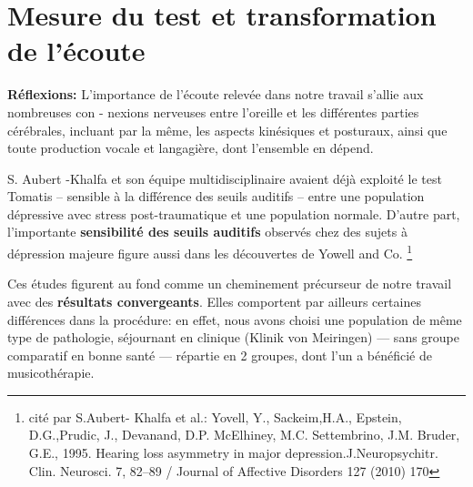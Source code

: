 \section{Mesure du test et trans\-for\-ma\-tion de l'écoute}
\textbf{Réflexions:}
L'importance de l'écoute relevée dans notre travail
s'allie aux nombreuses con - nexions nerveuses entre l'oreille et les
différentes parties cérébrales, incluant par la même, les aspects kinésiques
et posturaux, ainsi que toute production vocale et langagière,
dont l'ensemble en dépend.



S. Aubert -Khalfa et son équipe multidisciplinaire \autocite{affectiveDisorders} avaient déjà
exploité le test Tomatis -- sensible à la différence des
seuils auditifs -- entre une population
dépressive avec stress post-traumatique et une population normale.
D'autre part, l'importante\textbf{ sensibilité des seuils auditifs }observés chez des
sujets à dépression majeure figure aussi dans les découvertes de Yowell and Co.
\autocite{affectiveDisorders}\footnote{cité
par S.Aubert- Khalfa et al.: Yovell, Y.,
  Sackeim,H.A., Epstein, D.G.,Prudic, J., Devanand, D.P. McElhiney,
  M.C. Settembrino, J.M. Bruder, G.E., 1995. Hearing loss asymmetry in
  major depression.J.Neuropsychitr. Clin. Neurosci. 7, 82--89 / Journal of Affective Disorders 127
  (2010) 170}

Ces études figurent au fond comme un cheminement précurseur de notre
travail avec des \textbf{résultats convergeants}. Elles comportent par ailleurs certaines différences dans la
 procédure:  %
 en effet, nous avons choisi
 une population de même type de pathologie, séjournant en clinique (Klinik von Meiringen) --- sans
 groupe comparatif en bonne santé --- répartie en 2 groupes,
dont l'un a bénéficié de
musicothérapie.






